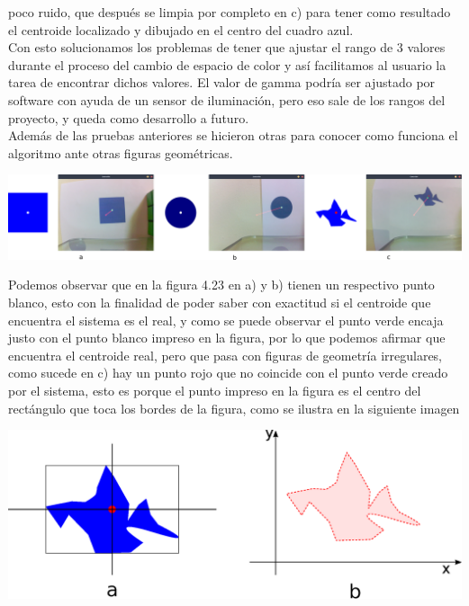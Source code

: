 poco ruido, que después se limpia por completo en c) para tener como resultado el centroide localizado y dibujado en el
centro del cuadro azul.\\
Con esto solucionamos los problemas de tener que ajustar el rango de 3 valores durante el proceso del cambio de espacio de color
y así facilitamos al usuario la tarea de encontrar dichos valores. El valor de gamma podría ser ajustado por software con
ayuda de un sensor de iluminación, pero eso sale de los rangos del proyecto, y queda como desarrollo a futuro.\\
Además de las pruebas anteriores se hicieron otras para conocer como funciona el algoritmo ante otras figuras geométricas.
\begin{center}
	\includegraphics[width=1.0\textwidth]{Contenido/Cuerpo/Capitulo4/Fig28.eps}
	\label{Fig9}
\end{center}
Podemos observar que en la figura 4.23 en a) y b) tienen un respectivo punto blanco, esto con la finalidad de poder saber con exactitud si
el centroide que encuentra el sistema es el real, y como se puede observar el punto verde encaja justo con el punto blanco
impreso en la figura, por lo que podemos afirmar que encuentra el centroide real, pero que pasa con figuras de geometría irregulares,
como sucede en c) hay un punto rojo que no coincide con el punto verde creado por el sistema, esto es porque el punto impreso
en la figura es el centro del rectángulo que toca los bordes de la figura, como se ilustra en la siguiente imagen
\begin{center}
	\includegraphics[width=1.0\textwidth]{Contenido/Cuerpo/Capitulo4/Fig29.eps}
	\label{Fig9}
\end{center}
